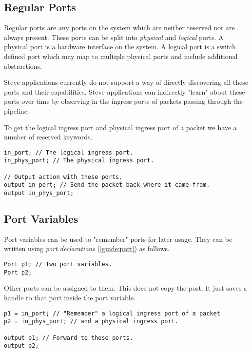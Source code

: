 \subsection{Regular Ports} \label{tut:regular_ports}

Regular ports are any ports on the system which are neither reserved nor are always present. These ports can be split into \textit{physical} and \textit{logical} ports. A physical port is a hardware interface on the system. A logical port is a switch defined port which may map to multiple physical ports and include additional abstractions.

Steve applications currently do not support a way of directly discovering all these ports and their capabilities. Steve applications can indirectly "learn" about these ports over time by observing in the ingress ports of packets passing through the pipeline.

To get the logical ingress port and physical ingress port of a packet we have a number of reserved keywords.

\begin{codepage}
\begin{lstlisting}
in_port; // The logical ingress port.
in_phys_port; // The physical ingress port.

// Output action with these ports.
output in_port; // Send the packet back where it came from.
output in_phys_port;
\end{lstlisting}
\end{codepage}

\subsection{Port Variables} \label{tut:declared_ports}

Port variables can be used to "remember" ports for later usage. They can be written using \textit{port declarations} (\ref{guide:port}) as follows.

\begin{codepage}
\begin{lstlisting}
Port p1; // Two port variables.
Port p2;
\end{lstlisting}
\end{codepage}

Other ports can be assigned to them. This does not copy the port. It just saves a handle to that port inside the port variable.

\begin{codepage}
\begin{lstlisting}
p1 = in_port; // "Remember" a logical ingress port of a packet
p2 = in_phys_port; // and a physical ingress port.

output p1; // Forward to these ports.
output p2;
\end{lstlisting}
\end{codepage}

